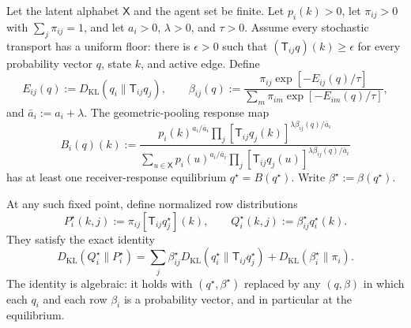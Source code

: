 \begin{theorem}
\label{thm:self_consistent_source_equilibrium}
Let the latent alphabet $\mathsf{X}$ and the agent set be finite. Let $p_i(k)>0$, let $\pi_{ij}>0$ with $\sum_j\pi_{ij}=1$, and let $a_i>0$, $\lambda>0$, and $\tau>0$. Assume every stochastic transport has a uniform floor: there is $\epsilon>0$ such that $(\mathsf{T}_{ij}q)(k)\ge\epsilon$ for every probability vector $q$, state $k$, and active edge. Define
\begin{equation}
E_{ij}(q):=D_{\mathrm{KL}}(q_i\|\mathsf{T}_{ij}q_j),
\qquad
\beta_{ij}(q):=
\frac{\pi_{ij}\exp[-E_{ij}(q)/\tau]}
{\sum_m\pi_{im}\exp[-E_{im}(q)/\tau]},
\label{eq:self_consistent_attention}
\end{equation}
and $\bar{a}_i:=a_i+\lambda$. The geometric-pooling response map
\begin{equation}
B_i(q)(k):=
\frac{
p_i(k)^{a_i/\bar{a}_i}
\prod_j[\mathsf{T}_{ij}q_j(k)]^{\lambda\beta_{ij}(q)/\bar{a}_i}
}{
\sum_{u\in\mathsf{X}}
p_i(u)^{a_i/\bar{a}_i}
\prod_j[\mathsf{T}_{ij}q_j(u)]^{\lambda\beta_{ij}(q)/\bar{a}_i}
}
\label{eq:self_consistent_response_map}
\end{equation}
has at least one receiver-response equilibrium $q^\star=B(q^\star)$. Write $\beta^\star:=\beta(q^\star)$.

At any such fixed point, define normalized row distributions
\begin{equation}
P_i^\star(k,j):=\pi_{ij}[\mathsf{T}_{ij}q_j^\star](k),
\qquad
Q_i^\star(k,j):=\beta_{ij}^\star q_i^\star(k).
\label{eq:equilibrium_source_joint}
\end{equation}
They satisfy the exact identity
\begin{equation}
D_{\mathrm{KL}}(Q_i^\star\|P_i^\star)
=\sum_j\beta_{ij}^\star D_{\mathrm{KL}}(q_i^\star\|\mathsf{T}_{ij}q_j^\star)
+D_{\mathrm{KL}}(\beta_i^\star\|\pi_i).
\label{eq:equilibrium_row_kl_identity}
\end{equation}
The identity is algebraic: it holds with $(q^\star,\beta^\star)$ replaced by any $(q,\beta)$ in which each $q_i$ and each row $\beta_i$ is a probability vector, and in particular at the equilibrium.
\end{theorem}

